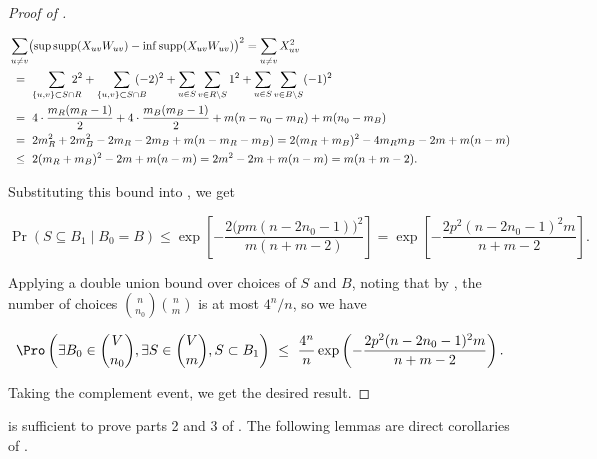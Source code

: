 \documentclass{toc}
\begin{document}
\begin{proof}[Proof of ]
\begin{linenomath}
\begin{equation*}
						\begin{aligned}
							& \sum_{u\neq v} \bigl(\sup \text{supp}(X_{uv}W_{uv})
							- \inf \text{supp}(X_{uv}W_{uv})\bigr)^2
							= \sum_{u\neq v} X_{uv}^2 \\
							& \ = \ \sum_{\{u, v\} \subset S\cap R}\hspace{-1em}2^2
							+ \sum_{\{u, v\} \subset S\cap B}\hspace{-1em}(-2)^2
							+ \sum_{u\in S} \sum_{v\in R\setminus S}1^2
							+ \sum_{u\in S} \sum_{v\in B\setminus S}(-1)^2 \\
							& \ = \ 4\cdot\frac{m_R(m_R - 1)}{2} + 4\cdot\frac{m_B(m_B - 1)}{2} + m(n - n_0 - m_R) + m(n_0 - m_B) \\
							& \ = \ 2m_R^2 + 2m_B^2 - 2m_R - 2m_B + m(n - m_R - m_B)
							= 2(m_R + m_B)^2 - 4m_Rm_B - 2m + m(n - m) \\
							& \ \le \ 2(m_R + m_B)^2 - 2m + m(n - m)
							= 2m^2 - 2m + m(n - m) = m(n + m - 2).
						\end{aligned}
				\end{equation*}\end{linenomath}
				Substituting this bound into , we get
				\begin{linenomath}\begin{equation*}
						\Pr(S\subseteq B_1\mid B_0 = B)
						\le \exp\left[-\frac{2\bigl(pm(n - 2n_0 - 1)\bigr)^2}{m(n + m - 2)}\right]
						= \exp\left[-\frac{2p^2(n - 2n_0 - 1)^2m}{n + m - 2}\right].
				\end{equation*}\end{linenomath}
				Applying a double union bound over choices of $S$ and $B$, noting that by , the number of choices $\binom{n}{n_0}\binom{n}{m}$ is at most $4^n/n$, so we have
				\begin{linenomath}\begin{equation*}
						\Pro \left(\exists B_0\in \binom{V}{n_0}, \exists S\in \binom{V}{m}, S\subset B_1 \right)
						\ \le \ \frac{4^n}{n} \exp\left(-\frac{2p^2(n - 2n_0 - 1)^2m}{n + m - 2} \right).
				\end{equation*}\end{linenomath}
				Taking the complement event, we get the desired result.
			\end{proof}
			
			 is sufficient to prove parts 2 and 3 of .
			The following lemmas are direct corollaries of .
			
\end{document}
